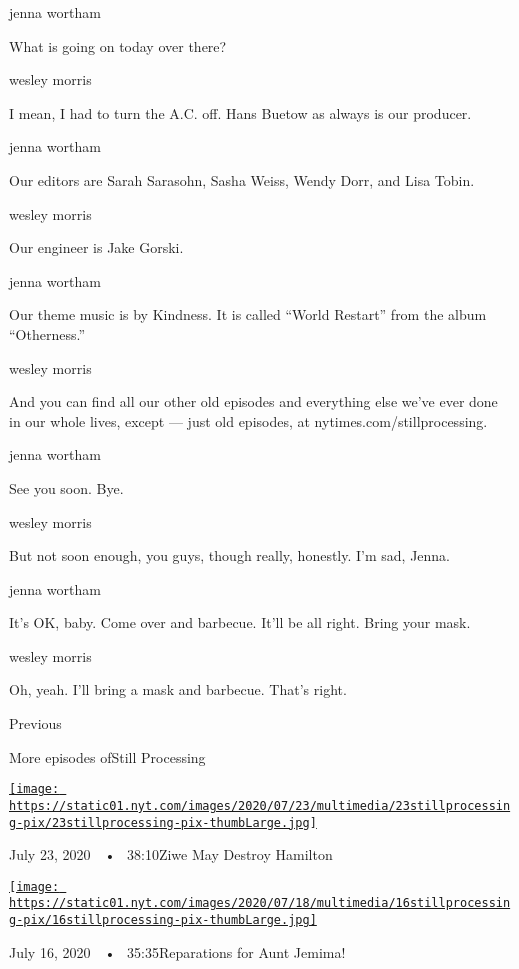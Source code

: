 jenna wortham

What is going on today over there?

wesley morris

I mean, I had to turn the A.C. off. Hans Buetow as always is our
producer.

jenna wortham

Our editors are Sarah Sarasohn, Sasha Weiss, Wendy Dorr, and Lisa Tobin.

wesley morris

Our engineer is Jake Gorski.

jenna wortham

Our theme music is by Kindness. It is called ``World Restart'' from the
album ``Otherness.''

wesley morris

And you can find all our other old episodes and everything else we've
ever done in our whole lives, except --- just old episodes, at
nytimes.com/stillprocessing.

jenna wortham

See you soon. Bye.

wesley morris

But not soon enough, you guys, though really, honestly. I'm sad, Jenna.

jenna wortham

It's OK, baby. Come over and barbecue. It'll be all right. Bring your
mask.

wesley morris

Oh, yeah. I'll bring a mask and barbecue. That's right.

Previous

More episodes ofStill Processing

\href{https://www.nytimes.com/2020/07/23/podcasts/hamilton-ziwe-discomfort.html?action=click\&module=audio-series-bar\&region=header\&pgtype=Article}{\texttt{[image: https://static01.nyt.com/images/2020/07/23/multimedia/23stillprocessing-pix/23stillprocessing-pix-thumbLarge.jpg]}}

July 23, 2020~~•~ 38:10Ziwe May Destroy Hamilton

\href{https://www.nytimes.com/2020/07/16/podcasts/reparations-for-aunt-jemima.html?action=click\&module=audio-series-bar\&region=header\&pgtype=Article}{\texttt{[image: https://static01.nyt.com/images/2020/07/18/multimedia/16stillprocessing-pix/16stillprocessing-pix-thumbLarge.jpg]}}

July 16, 2020~~•~ 35:35Reparations for Aunt Jemima!

